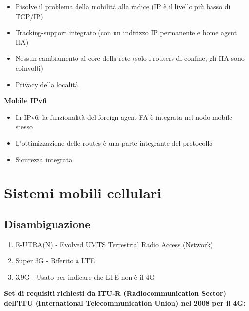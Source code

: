 \begin{itemize}
  \item Risolve il problema della mobilità alla radice (IP è il livello più
basso di TCP/IP)
  \item Tracking-support integrato (con un indirizzo IP permanente e home agent HA)
  \item Nessun cambiamento al core della rete (solo i routers di confine, gli HA sono coinvolti) 
  \item Privacy della località
\end{itemize}

\textbf{Mobile IPv6}

\begin{itemize}
  \item In IPv6, la funzionalità del foreign agent FA è integrata nel nodo
mobile stesso
  \item L'ottimizzazione delle routes è una parte integrante del protocollo
  \item Sicurezza integrata
\end{itemize}

\section{Sistemi mobili cellulari}

\subsection{Disambiguazione}

\begin{enumerate}
  \item E-UTRA(N) - Evolved UMTS Terrestrial Radio Access (Network)
  \item Super 3G - Riferito a LTE
  \item 3.9G - Usato per indicare che LTE non è il 4G
\end{enumerate}

\textbf{Set di requisiti richiesti da ITU-R (Radiocommunication Sector)
dell'ITU (International Telecommunication Union) nel 2008 per il 4G:}

